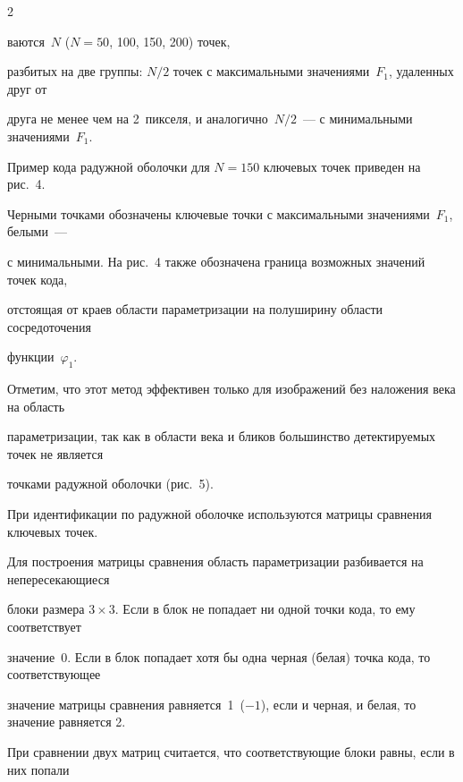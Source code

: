 \begin{multicols}{2}
\bigskip


\medskip


\addtocounter{figure}{2}





\noindent


ваются~$N$ ($N = 50$, 100, 150, 200) точек, 


разбитых на две группы: $N/2$ точек с максимальными значениями~$F_1$, удаленных друг от 


друга не менее чем на 2~пикселя, и аналогично~$N/2$~--- с минимальными значениями~$F_1$. 


Пример кода радужной оболочки для $N = 150$ ключевых точек приведен на рис.~4. 


Черными точками обозначены ключевые точки с максимальными значениями~$F_1$, белыми~--- 


с минимальными. На рис.~4 также обозначена граница возможных значений точек кода, 


отстоящая от краев области параметризации на полуширину области сосредоточения 


функции~$\varphi_1$.








Отметим, что этот метод эффективен только для изображений без наложения века на область 


параметризации, так как в области века и бликов большинство детектируемых точек не является 


точками радужной оболочки (рис.~5). 








При идентификации по радужной оболочке используются матрицы сравнения ключевых точек.


Для построения матрицы сравнения область пара\-мет\-ризации разбивается на непересекающиеся 


блоки размера $3\times 3$. Если в блок не попадает ни одной точки кода, то ему соответствует 


значение~0. Если в блок попадает хотя бы одна черная (белая) точка кода, то соответствующее 


значение матрицы сравнения равняется~1~($-1$), если и черная, и белая, то значение равняется 2. 


При сравнении двух матриц считается, что соответствующие блоки равны, если в них попали 



\end{multicols}
